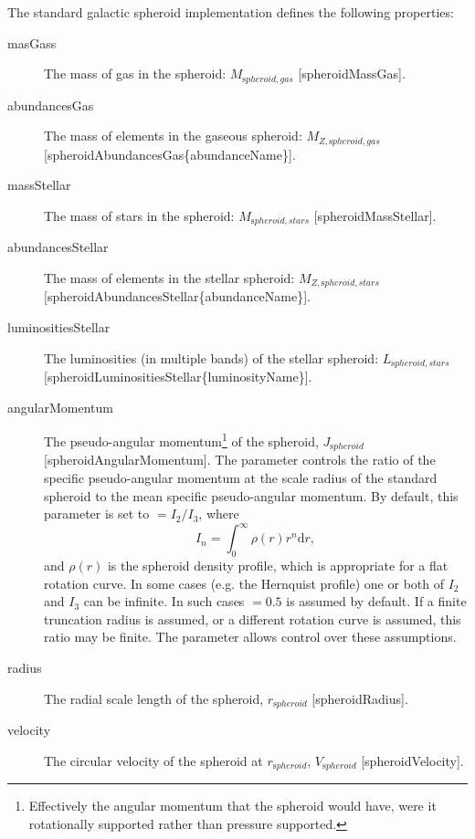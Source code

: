 The standard galactic spheroid implementation defines the following properties:
\begin{description}
 \item [{\normalfont \ttfamily masGass}] The mass of gas in the spheroid: $M_{\mathrm spheroid, gas}$ [{\normalfont \ttfamily spheroidMassGas}].
 \item [{\normalfont \ttfamily abundancesGas}] The mass of elements in the gaseous spheroid: $M_{Z, {\mathrm spheroid, gas}}$ [{\normalfont \ttfamily spheroidAbundancesGas\{abundanceName\}}].
 \item [{\normalfont \ttfamily massStellar}] The mass of stars in the spheroid: $M_{\mathrm spheroid, stars}$ [{\normalfont \ttfamily spheroidMassStellar}].
 \item [{\normalfont \ttfamily abundancesStellar}] The mass of elements in the stellar spheroid: $M_{Z, {\mathrm spheroid, stars}}$ [{\normalfont \ttfamily spheroidAbundancesStellar\{abundanceName\}}].
 \item [{\normalfont \ttfamily luminositiesStellar}] The luminosities (in multiple bands) of the stellar spheroid: $L_{\mathrm spheroid, stars}$ [{\normalfont \ttfamily spheroidLuminositiesStellar\{luminosityName\}}].
 \item [{\normalfont \ttfamily angularMomentum}] The pseudo-angular momentum\footnote{Effectively the angular momentum that the spheroid would have, were it rotationally supported rather than pressure supported.} of the spheroid, $J_{\mathrm spheroid}$ [{\normalfont \ttfamily spheroidAngularMomentum}]. The parameter {\normalfont \ttfamily [spheroidAngularMomentumAtScaleRadius]} controls the ratio of the specific pseudo-angular momentum at the scale radius of the standard spheroid to the mean specific pseudo-angular momentum. By default, this parameter is set to {\normalfont \ttfamily [spheroidAngularMomentumAtScaleRadius]} $= I_2/I_3$, where
\begin{equation}
I_n = \int_0^\infty \rho(r) r^n {\mathrm d}r,
\end{equation}
and $\rho(r)$ is the spheroid density profile, which is appropriate for a flat rotation curve. In some cases (e.g. the Hernquist profile) one or both of $I_2$ and $I_3$ can be infinite. In such cases {\normalfont \ttfamily [spheroidAngularMomentumAtScaleRadius]} $=0.5$ is assumed by default. If a finite truncation radius is assumed, or a different rotation curve is assumed, this ratio may be finite. The {\normalfont \ttfamily [spheroidAngularMomentumAtScaleRadius]} parameter allows control over these assumptions.
 \item [{\normalfont \ttfamily radius}] The radial scale length of the spheroid, $r_{\mathrm spheroid}$ [{\normalfont \ttfamily spheroidRadius}].
 \item [{\normalfont \ttfamily velocity}] The circular velocity of the spheroid at $r_{\mathrm spheroid}$, $V_{\mathrm spheroid}$ [{\normalfont \ttfamily spheroidVelocity}].
\end{description}

